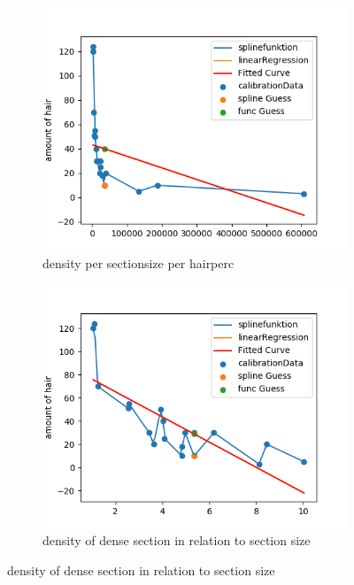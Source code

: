 \documentclass[german,a4paper, 12pt]{scrartcl}
\begin{document}
\begin{figure}[H]
	\medskip
	\begin{subfigure}{0.48\textwidth}
		\includegraphics[width=1.1\linewidth]{figBina/g9.png}
		\caption{density per sectionsize per hairperc} \label{fig:c}
	\end{subfigure}\hspace*{\fill}
	\begin{subfigure}{0.48\textwidth}
		\includegraphics[width=1.1\linewidth]{figBina/g10.png}
		\caption{density of dense section in relation to section size} \label{fig:d}
	\end{subfigure}
	

\end{figure}
\end{document}
